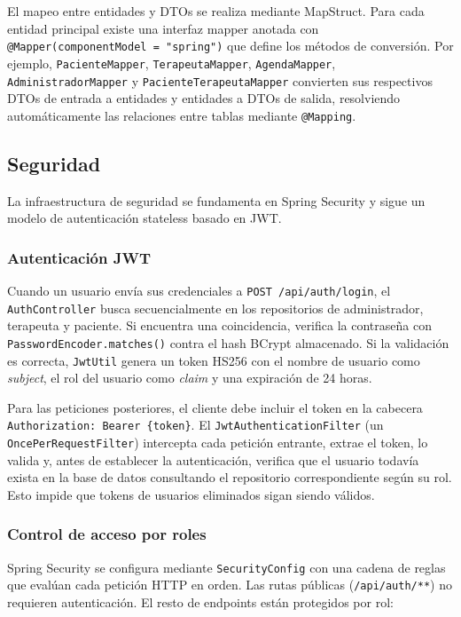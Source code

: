 El mapeo entre entidades y DTOs se realiza mediante MapStruct. Para cada entidad principal existe una interfaz mapper anotada con \texttt{@Mapper(componentModel = "spring")} que define los métodos de conversión. Por ejemplo, \texttt{PacienteMapper}, \texttt{TerapeutaMapper}, \texttt{AgendaMapper}, \texttt{AdministradorMapper} y \texttt{PacienteTerapeutaMapper} convierten sus respectivos DTOs de entrada a entidades y entidades a DTOs de salida, resolviendo automáticamente las relaciones entre tablas mediante \texttt{@Mapping}.

\subsection{Seguridad}
La infraestructura de seguridad se fundamenta en Spring Security y sigue un modelo de autenticación stateless basado en JWT.

\subsubsection{Autenticación JWT}
Cuando un usuario envía sus credenciales a \texttt{POST /api/auth/login}, el \texttt{AuthController} busca secuencialmente en los repositorios de administrador, terapeuta y paciente. Si encuentra una coincidencia, verifica la contraseña con \texttt{PasswordEncoder.matches()} contra el hash BCrypt almacenado. Si la validación es correcta, \texttt{JwtUtil} genera un token HS256 con el nombre de usuario como \textit{subject}, el rol del usuario como \textit{claim} y una expiración de 24 horas.

Para las peticiones posteriores, el cliente debe incluir el token en la cabecera \texttt{Authorization: Bearer \{token\}}. El \texttt{JwtAuthenticationFilter} (un \texttt{OncePerRequestFilter}) intercepta cada petición entrante, extrae el token, lo valida y, antes de establecer la autenticación, verifica que el usuario todavía exista en la base de datos consultando el repositorio correspondiente según su rol. Esto impide que tokens de usuarios eliminados sigan siendo válidos.

\subsubsection{Control de acceso por roles}
Spring Security se configura mediante \texttt{SecurityConfig} con una cadena de reglas que evalúan cada petición HTTP en orden. Las rutas públicas (\texttt{/api/auth/**}) no requieren autenticación. El resto de endpoints están protegidos por rol:

